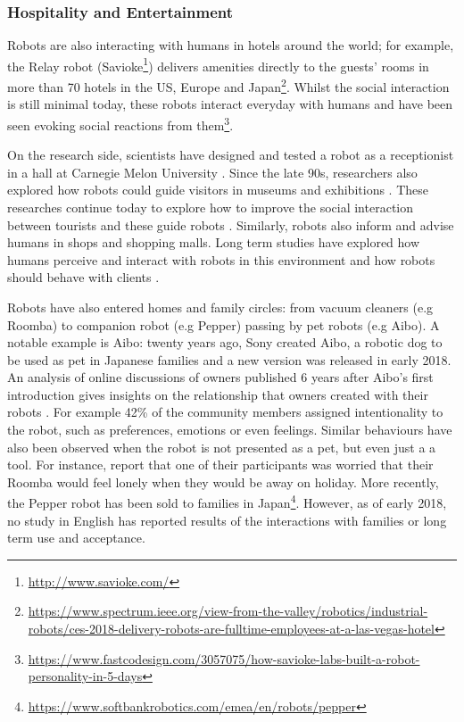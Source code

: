 \subsubsection{Hospitality and Entertainment} 
	
	Robots are also interacting with humans in hotels around the world; for example, the Relay robot (Savioke\footnote{\url{http://www.savioke.com/}}) delivers amenities directly to the guests' rooms in more than 70 hotels in the US, Europe and Japan\footnote{\url{https://www.spectrum.ieee.org/view-from-the-valley/robotics/industrial-robots/ces-2018-delivery-robots-are-fulltime-employees-at-a-las-vegas-hotel}}. Whilst the social interaction is still minimal today, these robots interact everyday with humans and have been seen evoking social reactions from them\footnote{\url{https://www.fastcodesign.com/3057075/how-savioke-labs-built-a-robot-personality-in-5-days}}. 
	
	On the research side, scientists have designed and tested a robot as a receptionist in a hall at Carnegie Melon University \citep{gockley2005designing}. Since the late 90s, researchers also explored how robots could guide visitors in museums and exhibitions \citep{thrun1999minerva,burgard1999experiences}. These researches continue today to explore how to improve the social interaction between tourists and these guide robots \citep{bennewitz2005towards}. Similarly, robots also inform and advise humans in shops and shopping malls. Long term studies have explored how humans perceive and interact with robots in this environment \citep{kanda2009affective} and how robots should behave with clients \citep{kanda2008will}.

    Robots have also entered homes and family circles: from vacuum cleaners (e.g Roomba) to companion robot (e.g Pepper) passing by pet robots (e.g Aibo). A notable example is Aibo: twenty years ago, Sony created Aibo, a robotic dog to be used as pet in Japanese families and a new version was released in early 2018. An analysis of online discussions of owners published 6 years after Aibo's first introduction gives insights on the relationship that owners created with their robots \citep{friedman2003hardware}. For example 42\% of the community members assigned intentionality to the robot, such as preferences, emotions or even feelings. Similar behaviours have also been observed when the robot is not presented as a pet, but even just a a tool. For instance, \cite{fink2013living} report that one of their participants was worried that their Roomba would feel lonely when they would be away on holiday. More recently, the Pepper robot has been sold to families in Japan\footnote{\url{https://www.softbankrobotics.com/emea/en/robots/pepper}}. However, as of early 2018, no study in English has reported results of the interactions with families or long term use and acceptance.
    
